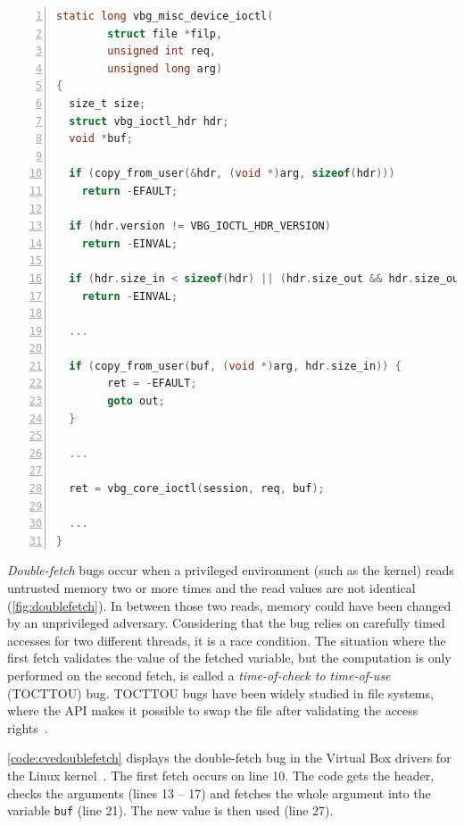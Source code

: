 \documentclass[conference]{IEEEtran}
\begin{document}
\begin{minipage}{\linewidth}
  

\begin{lstlisting}[language=C, caption={Abridged CVE-2018-12633 Double Fetch.},
                  label=code:cvedoublefetch,  breaklines=true, captionpos=b,
                  postbreak=\mbox{\textcolor{red}{$\hookrightarrow$}\space},
                  numbers=left,basicstyle=\scriptsize, xleftmargin=5.0ex]
static long vbg_misc_device_ioctl(
        struct file *filp,
        unsigned int req,
        unsigned long arg)
{
  size_t size;
  struct vbg_ioctl_hdr hdr;
  void *buf;

  if (copy_from_user(&hdr, (void *)arg, sizeof(hdr))) 
    return -EFAULT;
  
  if (hdr.version != VBG_IOCTL_HDR_VERSION) 
    return -EINVAL;
   
  if (hdr.size_in < sizeof(hdr) || (hdr.size_out && hdr.size_out < sizeof(hdr)))
    return -EINVAL;
  
  ...
  
  if (copy_from_user(buf, (void *)arg, hdr.size_in)) {
		ret = -EFAULT;
		goto out;
  }

  ...

  ret = vbg_core_ioctl(session, req, buf);

  ...
}
\end{lstlisting}
\end{minipage}
\emph{Double-fetch} bugs occur when a privileged environment (such as the
kernel) reads untrusted memory two or more times and the read values are not
identical (\autoref{fig:doublefetch}). In between those two reads, memory could
have been changed by an unprivileged adversary. Considering that the bug relies
on carefully timed accesses for two different threads, it is a race
condition. The situation where the first fetch validates the value of the
fetched variable, but the computation is only performed on the second fetch, is
called a \emph{time-of-check to time-of-use} (TOCTTOU) bug. TOCTTOU bugs have
been widely studied in file systems, where the API makes it possible to swap the
file after validating the access rights~\cite{payer2012protecting,
pu2006methodical, wei2010modeling, tsafrir2008portably}.

\autoref{code:cvedoublefetch} displays the double-fetch bug in the Virtual Box
drivers for the Linux kernel~\cite{cve201812633}. The first fetch occurs on line
10. The code gets the header, checks the arguments (lines 13 -- 17)
and fetches the whole argument into the variable \texttt{buf} (line 21). The new
value is then used (line 27).
\end{document}
